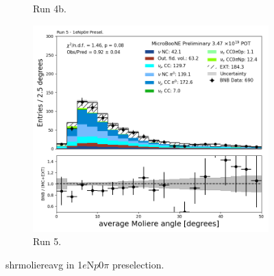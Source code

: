 \begin{figure}[H]
\begin{subfigure}[t]{0.32\linewidth}
        \caption{Run 4b.}
    \end{subfigure}%
    \hspace{0.2cm}%
    \begin{subfigure}[t]{0.32\linewidth}
        \includegraphics[width=\linewidth]{technote/Appendix_Preselection/Figures/1eNp0pi/Run5/shrmoliereavg_Run5_1eNp0pi_Presel.png}
        \caption{Run 5.}
    \end{subfigure}
    \caption{shrmoliereavg in 1$e$N$p$0$\pi$ preselection.}
\end{figure}

